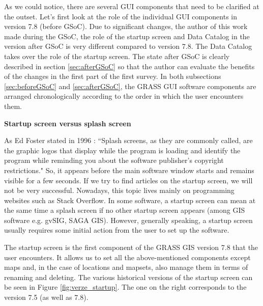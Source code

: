 \documentclass[a4paper,10pt,twoside]{article}
\begin{document}
\noindent As we could notice, there are several GUI components that
need to be clarified at the outset. Let's first look at the role of
the individual GUI components in version 7.8 (before GSoC). Due to
significant changes, the author of this work made during the GSoC, the
role of the startup screen and Data Catalog in the version after GSoC
is very different compared to version 7.8. The Data Catalog takes over
the role of the startup screen. The state after GSoC is clearly
described in section \ref{sec:afterGSoC} so that the author can evaluate
the benefits of the changes in the first part of the first survey. In
both subsections \ref{sec:beforeGSoC} and \ref{sec:afterGSoC}, the
GRASS GUI software components are arranged chronologically according
to the order in which the user encounters them.

\bigskip
\noindent \textbf {Startup screen versus splash screen}

\noindent As Ed Foster stated in 1996 \cite{foster}: ``Splash screens,
as they are commonly called, are the graphic logos that display while
the program is loading and identify the program while reminding you
about the software publisher's copyright restrictions." So, it appears
before the main software window starts and remains visible for a few
seconds. If we try to find articles on the startup screen, we will not
be very successful. Nowadays, this topic lives mainly on programming
websites such as Stack Overflow. In some software, a startup screen can
mean at the same time a splash screen if no other startup screen
appears (among GIS software e.g. gvSIG, SAGA GIS). However, generally
speaking, a startup screen usually requires some initial action from
the user to set up the software.

The startup screen is the first component of the GRASS GIS version 7.8
that the user encounters. It allows us to set all the above-mentioned components
except maps and, in the case of locations and mapsets, also manage
them in terms of renaming and deleting. The various historical
versions of the startup screen can be seen in Figure
\ref{fig:verze_startup}. The one on the right corresponds to the version
7.5 (as well as 7.8).
\end{document}
